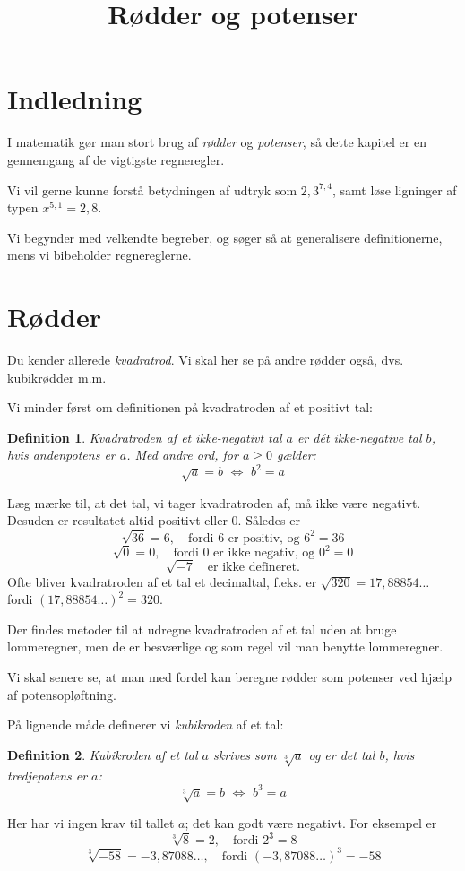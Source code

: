 \documentclass[12pt,oneside,a4paper]{article}
\title{Rødder og potenser}
\date{\vspace{-5ex}}
\theoremstyle{plain}
\newtheorem*{mydef}{Definition}
\begin{document}
\maketitle

\section*{Indledning}
I matematik gør man stort brug af {\em rødder} og {\em potenser}, så dette
kapitel er en gennemgang af de vigtigste regneregler.

Vi vil gerne kunne forstå betydningen af udtryk som $2,3^{7,4}$, samt løse
ligninger af typen $x^{5,1} = 2,8$.

Vi begynder med velkendte begreber, og søger så at generalisere definitionerne,
mens vi bibeholder regnereglerne.

\section*{Rødder}
Du kender allerede {\em kvadratrod}. Vi skal her se på andre rødder også, dvs.
kubikrødder m.m.

Vi minder først om definitionen på kvadratroden af et positivt tal:
\begin{mydef}
    Kvadratroden af et ikke-negativt tal $a$ er dét ikke-negative tal $b$, hvis
    andenpotens er $a$. Med andre ord, for $a\ge 0$ gælder:
    $$
    \sqrt{a} = b \,\, \Leftrightarrow \,\, b^2 = a
    $$
\end{mydef}

Læg mærke til, at det tal, vi tager kvadratroden af, må ikke være negativt. Desuden er resultatet altid positivt eller 0. Således er
$$
\sqrt{36} = 6,\quad \mbox{fordi 6 er positiv, og $6^2=36$}
$$
$$
\sqrt{0} = 0,\quad \mbox{fordi 0 er ikke negativ, og $0^2=0$}
$$
$$
\sqrt{-7} \quad \mbox{er ikke defineret.}
$$
Ofte bliver kvadratroden af et tal et decimaltal, f.eks. er $\sqrt{320} =
17,88854\ldots$ fordi $(17,88854\ldots)^2 = 320$.

Der findes metoder til at udregne kvadratroden af et tal uden at bruge
lommeregner, men de er besværlige og som regel vil man benytte lommeregner.

Vi skal senere se, at man med fordel kan beregne rødder som potenser ved hjælp
af potensopløftning.

På lignende måde definerer vi {\em kubikroden} af et tal:
\begin{mydef}
    Kubikroden af et tal $a$ skrives som $\sqrt[3]{a}$ og er det tal $b$, hvis
    tredjepotens er $a$:
    $$
    \sqrt[3]{a} = b \,\, \Leftrightarrow \,\, b^3 = a
    $$
\end{mydef}
Her har vi ingen krav til tallet $a$; det kan godt være negativt. For
eksempel er
$$
\sqrt[3]{8} = 2,\quad \mbox{fordi $2^3=8$}
$$
$$
\sqrt[3]{-58} = -3,87088\ldots,\quad \mbox{fordi $(-3,87088\ldots)^3=-58$}
$$
\end{document}
